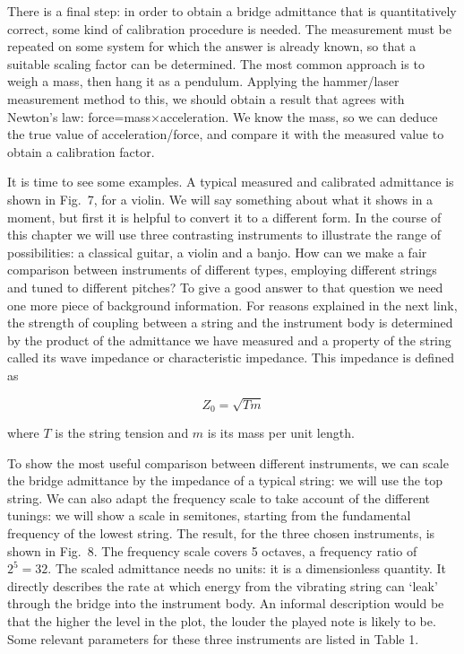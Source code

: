   There is a final step: in order to obtain a bridge admittance that is 
  quantitatively correct, some kind of calibration procedure is needed. The 
  measurement must be repeated on some system for which the answer is already 
  known, so that a suitable scaling factor can be determined. The most common 
  approach is to weigh a mass, then hang it as a pendulum. Applying the 
  hammer/laser measurement method to this, we should obtain a result that 
  agrees with Newton's law: force=mass$\times$acceleration. We know the mass, 
  so we can deduce the true value of acceleration/force, and compare it with 
  the measured value to obtain a calibration factor. 

  It is time to see some examples. A typical measured and calibrated admittance 
  is shown in Fig.\ 7, for a violin. We will say something about what it shows 
  in a moment, but first it is helpful to convert it to a different form. In 
  the course of this chapter we will use three contrasting instruments to 
  illustrate the range of possibilities: a classical guitar, a violin and a 
  banjo. How can we make a fair comparison between instruments of different 
  types, employing different strings and tuned to different pitches? To give a 
  good answer to that question we need one more piece of background 
  information. For reasons explained in the next link, the strength of coupling 
  between a string and the instrument body is determined by the product of the 
  admittance we have measured and a property of the string called its wave 
  impedance or characteristic impedance. This impedance is defined as 

  $$Z_0=\sqrt{T m}$$ 

  where $T$ is the string tension and $m$ is its mass per unit length. 


  To show the most useful comparison between different instruments, we can 
  scale the bridge admittance by the impedance of a typical string: we will use 
  the top string. We can also adapt the frequency scale to take account of the 
  different tunings: we will show a scale in semitones, starting from the 
  fundamental frequency of the lowest string. The result, for the three chosen 
  instruments, is shown in Fig.\ 8. The frequency scale covers 5 octaves, a 
  frequency ratio of $2^5=32$. The scaled admittance needs no units: it is a 
  dimensionless quantity. It directly describes the rate at which energy from 
  the vibrating string can `leak' through the bridge into the instrument body. 
  An informal description would be that the higher the level in the plot, the 
  louder the played note is likely to be. Some relevant parameters for these 
  three instruments are listed in Table 1. 

